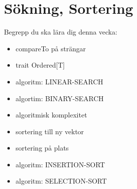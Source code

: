\chapter{Sökning, Sortering}\label{chapter:W10}
Begrepp du ska lära dig denna vecka:
\begin{multicols}{2}\begin{itemize}[nosep,label={$\square$},leftmargin=*]
\item compareTo på strängar
\item trait Ordered[T]
\item algoritm: LINEAR-SEARCH
\item algortim: BINARY-SEARCH
\item algoritmisk komplexitet
\item sortering till ny vektor
\item sortering på plats
\item algoritm: INSERTION-SORT
\item algoritm: SELECTION-SORT\end{itemize}\end{multicols}
